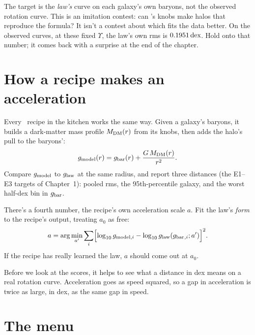 \begin{honestbox}
The target is the \emph{law's} curve on each galaxy's own baryons, not the observed rotation curve. This is an imitation contest: can \LCDM's knobs make halos that reproduce the formula? It isn't a contest about which fits the data better. On the observed curves, at these fixed $\Upsilon$, the law's own rms is $0.1951\,\mathrm{dex}$. Hold onto that number; it comes back with a surprise at the end of the chapter.
\end{honestbox}

\section{How a recipe makes an acceleration}

Every \LCDM\ recipe in the kitchen works the same way. Given a galaxy's baryons, it builds a dark-matter mass profile $M_{\rm DM}(r)$ from its knobs, then adds the halo's pull to the baryons':
\begin{equation}
g_{\rm model}(r)=g_{\rm bar}(r)+\frac{G\,M_{\rm DM}(r)}{r^2}.
\end{equation}
Compare $g_{\rm model}$ to $g_{\rm law}$ at the same radius, and report three distances (the E1--E3 targets of Chapter~1): pooled rms, the 95th-percentile galaxy, and the worst half-dex bin in $g_{\rm bar}$.

There's a fourth number, the recipe's own acceleration scale $a$. Fit the law's \emph{form} to the recipe's output, treating $a_0$ as free:
\begin{equation}
a=\arg\min_{a'}\sum_i\Bigl[\log_{10}g_{{\rm model},i}-\log_{10}g_{\rm law}(g_{\rm bar}{}_{,i};a')\Bigr]^2.
\end{equation}
If the recipe has really learned the law, $a$ should come out at $a_0$.

Before we look at the scores, it helps to see what a distance in dex means on a real rotation curve. Acceleration goes as speed squared, so a gap in acceleration is twice as large, in dex, as the same gap in speed.





\section{The menu}

